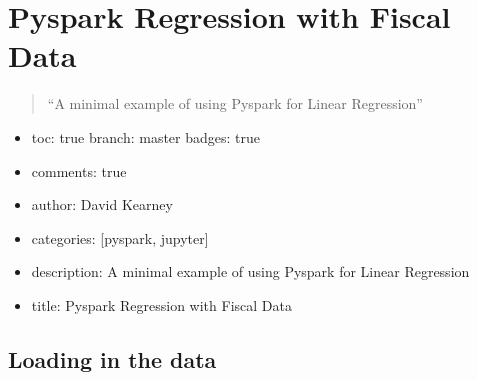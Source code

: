\documentclass[letterpaper,10pt,english]{sphinxmanual}
\begin{document}
\chapter{Pyspark Regression with Fiscal Data}
\label{\detokenize{2020-08-15-Pyspark-Fiscal-Data-Regression:pyspark-regression-with-fiscal-data}}\label{\detokenize{2020-08-15-Pyspark-Fiscal-Data-Regression::doc}}\begin{quote}

“A minimal example of using Pyspark for Linear Regression”
\end{quote}
\begin{itemize}
\item {} 
toc: true\sphinxhyphen{} branch: master\sphinxhyphen{} badges: true

\item {} 
comments: true

\item {} 
author: David Kearney

\item {} 
categories: {[}pyspark, jupyter{]}

\item {} 
description: A minimal example of using Pyspark for Linear Regression

\item {} 
title: Pyspark Regression with Fiscal Data

\end{itemize}


\section{Loading in the data}
\label{\detokenize{2020-08-15-Pyspark-Fiscal-Data-Regression:loading-in-the-data}}
\begin{sphinxVerbatim}[commandchars=\\\{\}]

  
    
\end{sphinxVerbatim}
\end{document}
